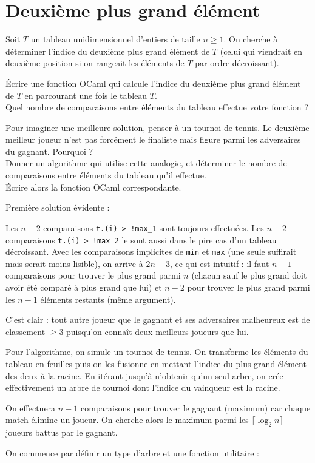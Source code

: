 \renewcommand{\SourceFile}{1-parcours-de-tableaux/src/1-4.ml}

\vspace{16pt}
\section{Deuxième plus grand élément}

Soit $T$ un tableau unidimensionnel d'entiers de taille $n\geq 1$. On cherche à déterminer l'indice du deuxième plus grand élément de $T$ (celui qui viendrait en deuxième position si on rangeait les éléments de $T$ par ordre décroissant).

\Q
Écrire une fonction OCaml qui calcule l'indice du deuxième plus grand élément de $T$ en parcourant une fois le tableau $T$.\\
Quel nombre de comparaisons entre éléments du tableau effectue votre fonction ?

\Q
Pour imaginer une meilleure solution, penser à un tournoi de tennis. Le deuxième meilleur joueur n'est pas forcément le finaliste mais figure parmi les adversaires du gagnant. Pourquoi ?\\
Donner un algorithme qui utilise cette analogie, et déterminer le nombre de comparaisons entre éléments du tableau qu'il effectue.\\
Écrire alors la fonction OCaml correspondante.

\Corrige

\Q
Première solution évidente :



Les $n-2$ comparaisons \texttt{t.(i) > !max\_1} sont toujours effectuées. Les $n-2$ comparaisons \texttt{t.(i) > !max\_2} le sont aussi dans le pire cas d'un tableau décroissant. Avec les comparaisons implicites de \texttt{min} et \texttt{max} (une seule suffirait mais serait moins lisible), on arrive à $2n-3$, ce qui est intuitif : il faut $n-1$ comparaisons pour trouver le plus grand parmi $n$ (chacun sauf le plus grand doit avoir été comparé à plus grand que lui) et $n-2$ pour trouver le plus grand parmi les $n-1$ éléments restants (même argument).

\Q
C'est clair : tout autre joueur que le gagnant et ses adversaires malheureux est de classement $\geq 3$ puisqu'on connaît deux meilleurs joueurs que lui.
\medskip

Pour l'algorithme, on simule un tournoi de tennis. On transforme les éléments du tableau en feuilles puis on les fusionne en mettant l'indice du plus grand élément des deux à la racine. En itérant jusqu'à n'obtenir qu'un seul arbre, on crée effectivement un arbre de tournoi dont l'indice du vainqueur est la racine.
\medskip

On effectuera $n-1$ comparaisons pour trouver le gagnant (maximum) car chaque match élimine un joueur. On cherche alors le maximum parmi les $\lceil \log_2 n \rceil$ joueurs battus par le gagnant.
\medskip

On commence par définir un type d'arbre et une fonction utilitaire :





\Fin

